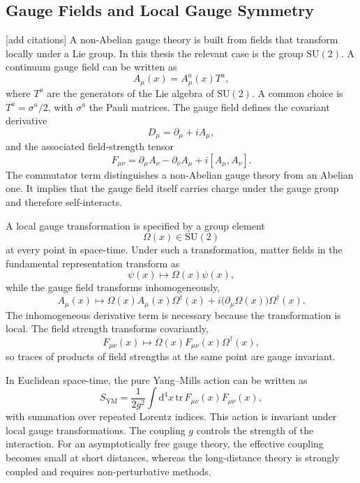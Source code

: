 \documentclass[12pt,a4paper,oneside,numbers=noenddot]{scrreprt}
\newcommand{\SU}{\mathrm{SU}}
\newcommand{\dd}{\mathrm{d}}
\begin{document}
\subsection{Gauge Fields and Local Gauge Symmetry}
\label{subsec:gauge-fields-local-symmetry}
[add citations]
A non-Abelian gauge theory is built from fields that transform locally under a
Lie group. In this thesis the relevant case is the group $\SU(2)$. A continuum
gauge field can be written as
\begin{equation}
  A_\mu(x) = A_\mu^a(x) T^a ,
\end{equation}
where $T^a$ are the generators of the Lie algebra of $\SU(2)$. A common choice is
$T^a = \sigma^a/2$, with $\sigma^a$ the Pauli matrices. The gauge field defines
the covariant derivative
\begin{equation}
  D_\mu = \partial_\mu + i A_\mu ,
\end{equation}
and the associated field-strength tensor
\begin{equation}
  F_{\mu\nu}
  =
  \partial_\mu A_\nu
  -
  \partial_\nu A_\mu
  +
  i [A_\mu,A_\nu] .
\end{equation}
The commutator term distinguishes a non-Abelian gauge theory from an Abelian
one. It implies that the gauge field itself carries charge under the gauge
group and therefore self-interacts.

A local gauge transformation is specified by a group element
\begin{equation}
  \Omega(x) \in \SU(2)
\end{equation}
at every point in space-time. Under such a transformation, matter fields in the
fundamental representation transform as
\begin{equation}
  \psi(x) \mapsto \Omega(x)\psi(x),
\end{equation}
while the gauge field transforms inhomogeneously,
\begin{equation}
  A_\mu(x)
  \mapsto
  \Omega(x) A_\mu(x) \Omega^\dagger(x)
  +
  i \bigl(\partial_\mu \Omega(x)\bigr)\Omega^\dagger(x).
\end{equation}
The inhomogeneous derivative term is necessary because the transformation is
local. The field strength transforms covariantly,
\begin{equation}
  F_{\mu\nu}(x)
  \mapsto
  \Omega(x) F_{\mu\nu}(x) \Omega^\dagger(x),
\end{equation}
so traces of products of field strengths at the same point are gauge invariant.

In Euclidean space-time, the pure Yang--Mills action can be written as
\begin{equation}
  S_{\mathrm{YM}}
  =
  \frac{1}{2g^2}
  \int \dd^4 x \,
  \mathrm{tr}\,
  F_{\mu\nu}(x) F_{\mu\nu}(x),
  \label{eq:continuum-yang-mills-action}
\end{equation}
with summation over repeated Lorentz indices. This action is invariant under
local gauge transformations. The coupling $g$ controls the strength of the
interaction. For an asymptotically free gauge theory, the effective coupling
becomes small at short distances, whereas the long-distance theory is strongly
coupled and requires non-perturbative methods.
\end{document}
